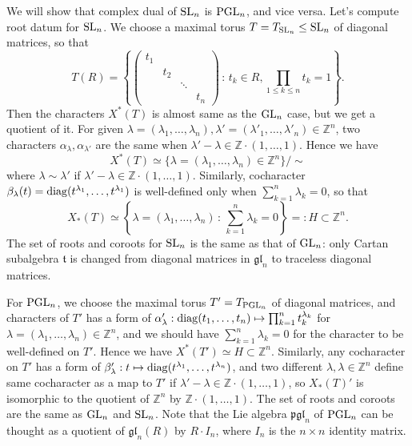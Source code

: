 \begin{problem}
We will show that complex dual of $\operatorname{\mathrm{SL}}_n$ is $\operatorname{\mathrm{PGL}}_n$, and vice versa.
Let's compute root datum for $\operatorname{\mathrm{SL}}_n$.
We choose a maximal torus $T = T_{\operatorname{\mathrm{SL}}_n} \leq \operatorname{\mathrm{SL}}_n$ of diagonal matrices, so that
$$
T(R) = \left\{\begin{pmatrix}t_1 & & & \\ & t_2 & & \\ & & \ddots & \\ & & & t_n\end{pmatrix}\,:\, t_k \in R, \prod_{1\leq k \leq n}t_k =1 \right\}.
$$
Then the characters $X^*(T)$ is almost same as the $\operatorname{\mathrm{GL}}_n$ case, but we get a quotient of it.
For given $\lambda = (\lambda_1, \dots, \lambda_n), \lambda' = (\lambda'_1, \dots, \lambda'_n) \in \mathbb{Z}^{n}$, 
two characters $\alpha_{\lambda}, \alpha_{\lambda'}$ are the same when $\lambda' -\lambda \in \mathbb{Z}\cdot (1, \dots, 1)$.
Hence we have
$$
X^{*}(T) \simeq \{\lambda = (\lambda_1, \dots, \lambda_n) \in \mathbb{Z}^{n}\}/ \sim
$$
where $\lambda \sim \lambda'$ if $\lambda' - \lambda \in \mathbb{Z} \cdot (1, \dots, 1)$.
Similarly, cocharacter $\beta_{\lambda}(t) = \operatorname{\mathrm{diag}}(t^{\lambda_1}, \dots, t^{\lambda_1})$ is well-defined only
when $\sum_{k=1}^{n} \lambda_{k} = 0$, so that 
$$
X_{*}(T) \simeq \left\{\lambda = (\lambda_1, \dots, \lambda_n)\,:\, \sum_{k=1}^{n} \lambda_k = 0\right\} =: H\subset \mathbb{Z}^{n}.
$$
The set of roots and coroots for $\operatorname{\mathrm{SL}}_{n}$ is the same as that of $\operatorname{\mathrm{GL}}_n$: only Cartan subalgebra $\mathfrak{t}$ is changed from
diagonal matrices in $\mathfrak{gl}_n$ to traceless diagonal matrices.

For $\operatorname{\mathrm{PGL}}_n$, we choose the maximal torus $T' = T_{\operatorname{\mathrm{PGL}}_n}$ of diagonal matrices, and characters
of $T'$ has a form of $\alpha_{\lambda}':\operatorname{\mathrm{diag}}(t_1, \dots, t_n) \mapsto \prod_{k=1}^{n} t_k^{\lambda_k}$
for $\lambda = (\lambda_1, \dots, \lambda_n) \in \mathbb{Z}^{n}$, and we should have $\sum_{k=1}^{n} \lambda_{k} = 0$ for the character to be well-defined
on $T'$. Hence we have $X^*(T') \simeq H \subset \mathbb{Z}^n$.
Similarly, any cocharacter on $T'$ has a form of $\beta_{\lambda}':t \mapsto \operatorname{\mathrm{diag}}(t^{\lambda_1}, \dots, t^{\lambda_n})$, and two different $\lambda, \lambda \in \mathbb{Z}^{n}$
define same cocharacter as a map to $T'$ if $\lambda' -\lambda \in \mathbb{Z}\cdot (1, \dots, 1)$, so 
$X_{*}(T)'$ is isomorphic to the quotient of $\mathbb{Z}^{n}$ by $\mathbb{Z} \cdot (1, \dots, 1)$.
The set of roots and coroots are the same as $\operatorname{\mathrm{GL}}_n$ and $\operatorname{\mathrm{SL}}_n$.
Note that the Lie algebra $\mathfrak{pgl}_n$ of $\operatorname{\mathrm{PGL}}_n$ can be thought 
as a quotient of $\mathfrak{gl}_n(R)$ by $R\cdot I_n$, where $I_n$ is the $n\times n$ identity matrix.


\end{problem}
